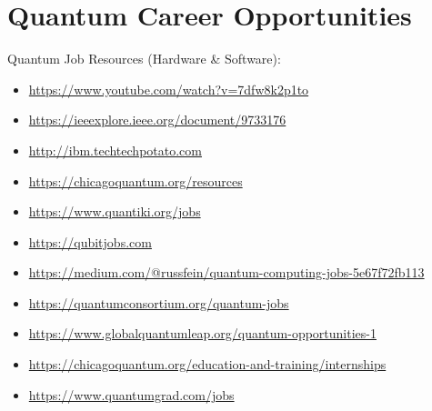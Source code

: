 \chapter{\LARGE{Quantum Career Opportunities}}

\begin{flushleft}
\large{Quantum Job Resources (Hardware \& Software):}
\end{flushleft}

\centering

\large\begin{itemize}
\item\url{https://www.youtube.com/watch?v=7dfw8k2p1to}
\item\url{https://ieeexplore.ieee.org/document/9733176}
\item\url{http://ibm.techtechpotato.com}
\item\url{https://chicagoquantum.org/resources} 
\item\url{https://www.quantiki.org/jobs} 
\item\url{https://qubitjobs.com} 
\item\url{https://medium.com/@russfein/quantum-computing-jobs-5e67f72fb113} 
\item\url{https://quantumconsortium.org/quantum-jobs} 
\item\url{https://www.globalquantumleap.org/quantum-opportunities-1} 
\item\url{https://chicagoquantum.org/education-and-training/internships} 
\item\url{https://www.quantumgrad.com/jobs}

\end{itemize}